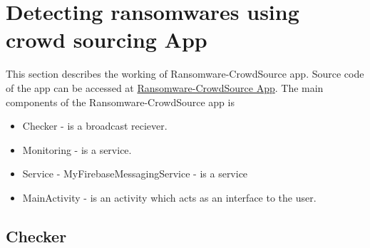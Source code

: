 \section{Detecting ransomwares using crowd sourcing App}

This section describes the working of Ransomware-CrowdSource app.
Source code of the app can be accessed at \href{https://github.com/jithin005/Ransomware-CrowdSource}{Ransomware-CrowdSource App}.
The main components of the Ransomware-CrowdSource app is 
\begin{itemize}
    \item Checker - is a broadcast reciever.
    \item Monitoring - is a service.
    \item Service - MyFirebaseMessagingService - is a service
    \item MainActivity - is an activity which acts as an interface to the user.
\end{itemize}

\subsection{Checker}


